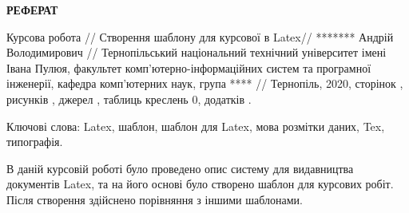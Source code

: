 
\begin{center}
	\uppercase{\textbf{Реферат}}
\end{center}
	
	Курсова робота // Створення шаблону для курсової в Latex// ******* Андрій Володимирович // Тернопільський національний
	технічний
	університет
	імені
	Івана
	Пулюя,
	факультет
	комп’ютерно-інформаційних систем та програмної інженерії, кафедра комп’ютерних наук,
	група **** // Тернопіль, 2020, сторінок \pageref{LastPage}, рисунків \totalfigures{} , джерел  , таблиць \totaltables{}
	креслень 0, додатків .
	
	Ключові слова: Latex, шаблон, шаблон для Latex, мова розмітки даних, Tex, типографія.
	
	В даній курсовій роботі було проведено опис систему для видавництва документів  Latex, та на його основі було створено шаблон для курсових робіт. Після створення здійснено порівняння з іншими шаблонами.
\newpage